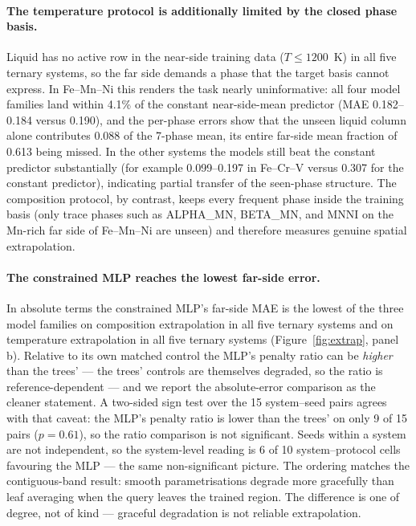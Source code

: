 \documentclass[preprint,12pt,authoryear]{elsarticle}
\begin{document}
\paragraph{The temperature protocol is additionally limited by the closed
phase basis.}
Liquid has no active row in the near-side training data ($T \le 1200$~K) in
all five ternary systems, so the far side demands a phase that the target basis
cannot express. In
Fe--Mn--Ni this renders the task nearly uninformative: all four model
families land within 4.1\% of the constant near-side-mean predictor (MAE
0.182--0.184 versus 0.190), and the per-phase errors show that the unseen
liquid column alone contributes 0.088 of the 7-phase mean, its entire
far-side mean fraction of 0.613 being missed. In the other systems the
models still beat the constant predictor substantially (for example
0.099--0.197 in Fe--Cr--V versus 0.307 for the constant predictor),
indicating partial transfer of the seen-phase structure. The composition
protocol, by contrast, keeps every frequent phase inside the training basis
(only trace phases such as ALPHA\_MN, BETA\_MN, and MNNI on the Mn-rich far
side of Fe--Mn--Ni are unseen) and therefore measures genuine spatial
extrapolation.

\paragraph{The constrained MLP reaches the lowest far-side error.}
In absolute terms the constrained MLP's far-side MAE is the lowest of the
three model families on composition extrapolation in all five ternary systems and
on temperature extrapolation in all five ternary systems (Figure~\ref{fig:extrap},
panel b). Relative to its own matched control the MLP's penalty ratio can
be \emph{higher} than the trees' --- the trees' controls are themselves
degraded, so the ratio is reference-dependent --- and we report the
absolute-error comparison as the cleaner statement. A two-sided sign test
over the 15 system--seed pairs agrees with that caveat: the MLP's
penalty ratio is lower than the trees' on only 9 of 15 pairs
($p = 0.61$), so the ratio comparison is not significant. Seeds within a
system are not independent, so the system-level reading is 6 of 10
system--protocol cells favouring the MLP --- the same non-significant
picture. The ordering matches
the contiguous-band result: smooth parametrisations degrade more
gracefully than leaf averaging when the query leaves the trained region.
The difference is one of degree, not of kind --- graceful degradation is
not reliable extrapolation.
\end{document}
